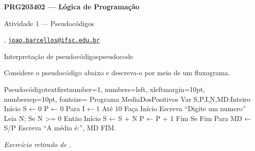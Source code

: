 





\begin{Large}
    \textbf{PRG203402 --- Lógica de Programação}
    
    Atividade 1 --- Pseudocódigos \hfill {}
\end{Large}

\vspace{1ex}
\textbf{} , \href{mailto:joao.barcellos@ifsc.edu.br}{\texttt{joao.barcellos@ifsc.edu.br}}\\
\textbf{}


\vspace{2ex}

\begin{problem}{Interpretação de pseudocódigos}{pseudocode}

Considere o pseudocódigo abaixo e descreva-o por meio de um fluxograma.

\begin{mylisting}[enhanced]{Pseudocódigo}{text}{firstnumber=1, numbers=left, xleftmargin=10pt, numbersep=10pt, fontsize=\small}
Programa MediaDosPositivos
Var S,P,I,N,MD:Inteiro
Início
    S ← 0
    P ← 0
    Para I ← 1 Até 10 Faça
    Início
        Escreva “Digite um numero”
        Leia N;
        Se N >= 0 Então
        Início
            S ← S + N
            P ← P + 1
        Fim Se
    Fim Para
    MD ← S/P
    Escreva “A média é:”, MD
FIM. 
\end{mylisting}

\textit{\footnotesize Exercício retirado de \cite{uninove_2013}.}

\end{problem}

\newpage

\printbibliography


